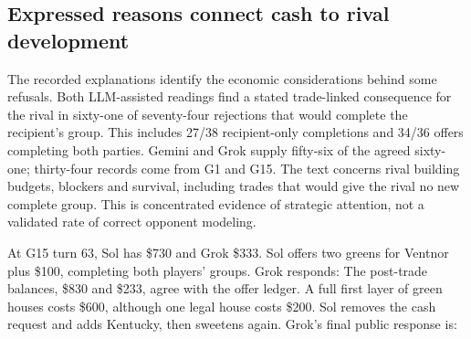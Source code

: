 \subsection{Expressed reasons connect cash to rival development}

The recorded explanations identify the economic considerations behind some refusals. Both LLM-assisted readings find a stated trade-linked consequence for the rival in sixty-one of seventy-four rejections that would complete the recipient's group. This includes 27/38 recipient-only completions and 34/36 offers completing both parties. Gemini and Grok supply fifty-six of the agreed sixty-one; thirty-four records come from G1 and G15. The text concerns rival building budgets, blockers and survival, including trades that would give the rival no new complete group. This is concentrated evidence of strategic attention, not a validated rate of correct opponent modeling.

At G15 turn 63, Sol has \$730 and Grok \$333. Sol offers two greens for Ventnor plus \$100, completing both players' groups. Grok responds:
The post-trade balances, \$830 and \$233, agree with the offer ledger. A full first layer of green houses costs \$600, although one legal house costs \$200. Sol removes the cash request and adds Kentucky, then sweetens again. Grok's final public response is:

